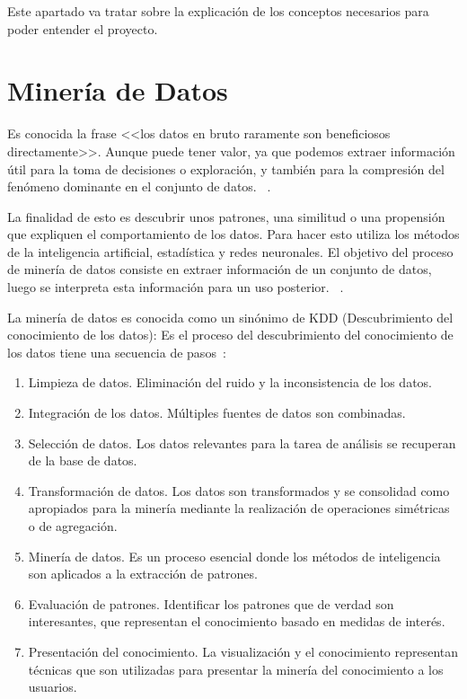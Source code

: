 
Este apartado va tratar sobre la explicación de los conceptos necesarios para poder entender el proyecto.

\section{Minería de Datos}
Es conocida la frase <<los datos en bruto raramente son beneficiosos directamente>>. Aunque puede tener valor, ya que podemos extraer información útil para la toma de decisiones o exploración, y también para la compresión del fenómeno dominante en el conjunto de datos. ~\cite{mineria}.

La finalidad de esto es descubrir unos patrones, una similitud o una propensión que expliquen el comportamiento de los datos. Para hacer esto utiliza los métodos de la inteligencia artificial, estadística y redes neuronales.
El objetivo del proceso de minería de datos consiste en extraer información de un conjunto de datos, luego se interpreta esta información para un uso posterior. ~\cite{wiki:datamining}.

La minería de datos es conocida como un sinónimo de KDD (Descubrimiento del conocimiento de los datos): Es el proceso del descubrimiento del conocimiento de los datos tiene una secuencia de pasos~\cite{mineria_KDD}:

\begin{enumerate}[1.]
	\item Limpieza de datos. Eliminación del ruido y la inconsistencia de los datos.
	\item Integración de los datos. Múltiples fuentes de datos son combinadas.
	\item Selección de datos. Los datos relevantes para la tarea de análisis se recuperan de la base de datos.
	\item Transformación de datos. Los datos son transformados y se consolidad como apropiados para la minería mediante la realización de operaciones simétricas o de agregación.
	\item Minería de datos. Es un proceso esencial donde los métodos de inteligencia son aplicados a la extracción de patrones.
	\item Evaluación de patrones. Identificar los patrones que de verdad son interesantes, que representan el conocimiento basado en medidas de interés.
	\item Presentación del conocimiento. La visualización y el conocimiento representan técnicas que son utilizadas para presentar la minería del conocimiento a los usuarios.
\end{enumerate}


